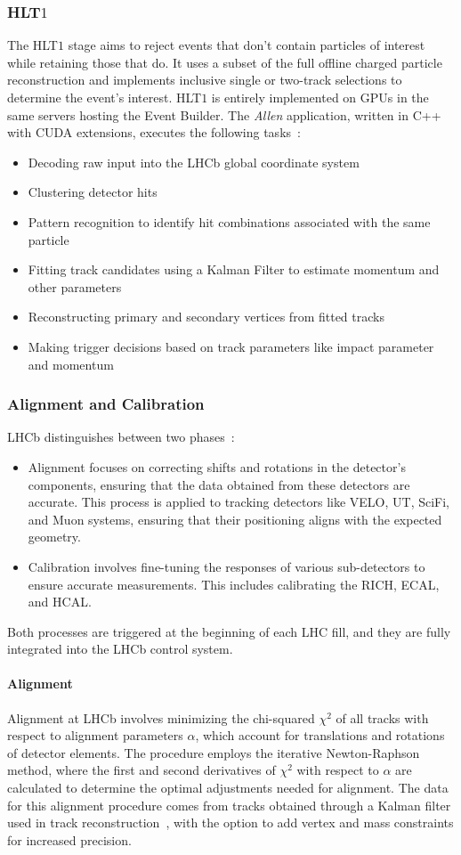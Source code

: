 \subsubsection{HLT$1$}
The HLT$1$ stage aims to reject events that don't contain particles of interest while retaining those that do. It uses a subset of the full offline charged particle reconstruction and implements inclusive single or two-track selections to determine the event's interest. HLT$1$ is entirely implemented on GPUs in the same servers hosting the Event Builder. The \textit{Allen} application, written in C++ with CUDA extensions, executes the following tasks~\cite{CERN-LHCC-2020-006}:
\begin{itemize}
\item Decoding raw input into the LHCb global coordinate system
\item Clustering detector hits
\item Pattern recognition to identify hit combinations associated with the same particle
\item Fitting track candidates using a Kalman Filter to estimate momentum and other parameters
\item Reconstructing primary and secondary vertices from fitted tracks
\item Making trigger decisions based on track parameters like impact parameter and momentum
\end{itemize}
\subsubsection{Alignment and Calibration}\label{sec:alignment}
LHCb distinguishes between two phases~\cite{Dziurda:2640712}:
\begin{itemize}
\item Alignment focuses on correcting shifts and rotations in the detector's components, ensuring that the data obtained from these detectors are accurate. This process is applied to tracking detectors like VELO, UT, SciFi, and Muon systems, ensuring that their positioning aligns with the expected geometry.
\item Calibration involves fine-tuning the responses of various sub-detectors to ensure accurate measurements. This includes calibrating the RICH, ECAL, and HCAL.
\end{itemize}
Both processes are triggered at the beginning of each LHC fill, and they are fully integrated into the LHCb control system. 
\paragraph{Alignment}
Alignment at LHCb involves minimizing the chi-squared $\chi^2$ of all tracks with respect to alignment parameters $\alpha$, which account for translations and rotations of detector elements. The procedure employs the iterative Newton-Raphson method, where the first and second derivatives of $\chi^2$ with respect to 
 $\alpha$ are calculated to determine the optimal adjustments needed for alignment. The data for this alignment procedure comes from tracks obtained through a Kalman filter used in track reconstruction~\cite{HULSBERGEN2009471}, with the option to add vertex and mass constraints for increased precision.

